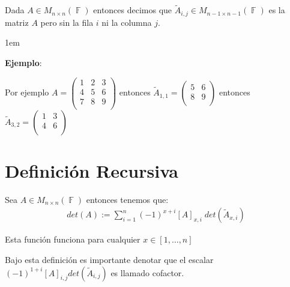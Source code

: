 \documentclass[12pt, fleqn]{report}                             %
\newenvironment{SmallIndentation}[1][0.75em]                    %
        {\begin{adjustwidth}{#1}{}\begin{footnotesize}}             %
        {\end{footnotesize}\end{adjustwidth}}                       %
\theoremstyle{break}                                            %
\DeclareMathOperator \GenericField {\mathbb{F}}                 %
\newcommand{\pVector}[1]                                        %
        { \ensuremath{\begin{pmatrix}#1\end{pmatrix}} }             %
\begin{document}
            Dada $A \in M_{n \times n}(\GenericField)$ entonces decimos que
            $\tilde A_{i, j} \in M_{n-1 \times n-1}(\GenericField)$ es la matriz $A$
            pero sin la fila $i$ ni la columna $j$.

            \begin{SmallIndentation}[1em]
                \textbf{Ejemplo}:
                
                Por ejemplo $A = \pVector{
                    1 & 2 & 3   \\
                    4 & 5 & 6   \\
                    7 & 8 & 9   \\
                }$ entonces $\tilde A_{1, 1} = \pVector{
                    5 & 6   \\
                    8 & 9   \\
                }$ entonces $\tilde A_{3, 2} = \pVector{
                    1 & 3   \\
                    4 & 6   \\
                }$ 
            
            \end{SmallIndentation}
                


        \vspace{1em}
        \section{Definición Recursiva}

            Sea $A \in M_{n \times n}(\GenericField)$ entonces tenemos que:
            \begin{align*}
                det(A) := \sum_{i = 1}^n (-1)^{x + i} [A]_{x, i} \; det(\tilde A_{x, i})
            \end{align*}

            Esta función funciona para cualquier $x \in [1, \dots, n]$

            Bajo esta definición es importante denotar que el escalar 
            $(-1)^{1 + i} [A]_{i, j} det(\tilde A_{i, j})$ es llamado cofactor.



        \clearpage
\end{document}
